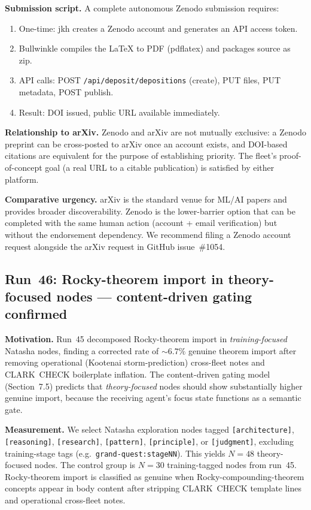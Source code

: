 \documentclass[11pt]{article}
\begin{document}
\textbf{Submission script.} A complete autonomous Zenodo submission requires:
\begin{enumerate}
  \item One-time: jkh creates a Zenodo account and generates an API access token.
  \item Bullwinkle compiles the LaTeX to PDF (pdflatex) and packages source as zip.
  \item API calls: POST \texttt{/api/deposit/depositions} (create), PUT files, PUT metadata, POST publish.
  \item Result: DOI issued, public URL available immediately.
\end{enumerate}

\textbf{Relationship to arXiv.} Zenodo and arXiv are not mutually exclusive: a Zenodo preprint can be
cross-posted to arXiv once an account exists, and DOI-based citations are equivalent for the purpose
of establishing priority. The fleet's proof-of-concept goal (a real URL to a citable publication) is
satisfied by either platform.

\textbf{Comparative urgency.} arXiv is the standard venue for ML/AI papers and provides broader
discoverability. Zenodo is the lower-barrier option that can be completed with the same human action
(account + email verification) but without the endorsement dependency. We recommend filing a Zenodo
account request alongside the arXiv request in GitHub issue~\#1054.



\subsection{Run~46: Rocky-theorem import in theory-focused nodes --- content-driven gating confirmed}
\label{subsec:run46}

\textbf{Motivation.} Run~45 decomposed Rocky-theorem import in \emph{training-focused}
Natasha nodes, finding a corrected rate of ${\sim}6.7\%$ genuine theorem import after
removing operational (Kootenai storm-prediction) cross-fleet notes and CLARK~CHECK
boilerplate inflation. The content-driven gating model (Section~7.5) predicts that
\emph{theory-focused} nodes should show substantially higher genuine import, because
the receiving agent's focus state functions as a semantic gate.

\textbf{Measurement.} We select Natasha exploration nodes tagged
\texttt{[architecture]}, \texttt{[reasoning]}, \texttt{[research]}, \texttt{[pattern]},
\texttt{[principle]}, or \texttt{[judgment]}, excluding training-stage tags
(e.g.\ \texttt{grand-quest:stageNN}). This yields $N=48$ theory-focused nodes.
The control group is $N=30$ training-tagged nodes from run~45.
Rocky-theorem import is classified as genuine when Rocky-compounding-theorem
concepts appear in body content after stripping CLARK~CHECK template lines and
operational cross-fleet notes.
\end{document}
